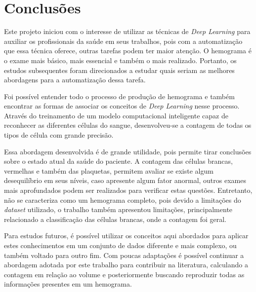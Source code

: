 \chapter{Conclusões}
\label{chap:conclusoes}

Este projeto iniciou com o interesse de utilizar as técnicas de \emph{Deep Learning} para auxiliar os profissionais da saúde em seus trabalhos, pois com a automatização que essa técnica oferece, outras tarefas podem ter maior atenção. O hemograma é o exame mais básico, mais essencial e também o mais realizado. Portanto, os estudos subsequentes foram direcionados a estudar quais seriam as melhores abordagens para a automatização dessa tarefa.

Foi possível entender todo o processo de produção de hemograma e também encontrar as formas de associar os conceitos de \emph{Deep Learning} nesse processo. Através do treinamento de um modelo computacional inteligente capaz de reconhecer as diferentes células do sangue, desenvolveu-se a contagem de todas os tipos de célula com grande precisão.

Essa abordagem desenvolvida é de grande utilidade, pois permite tirar conclusões sobre o estado atual da saúde do paciente. A contagem das células brancas, vermelhas e também das plaquetas, permitem avaliar se existe algum desequilíbrio em seus níveis, caso apresente algum fator anormal, outros exames mais aprofundados podem ser realizados para verificar estas questões. Entretanto, não se caracteriza como um hemograma completo, pois devido a limitações do \emph{dataset} utilizado, o trabalho também apresentou limitações, principalmente relacionado a classificação das células brancas, onde a contagem foi geral.

Para estudos futuros, é possível utilizar os conceitos aqui abordados para aplicar estes conhecimentos em um conjunto de dados diferente e mais complexo, ou também voltado para outro fim. Com poucas adaptações é possível continuar a abordagem adotada por este trabalho para contribuir na literatura, calculando a contagem em relação ao volume e posteriormente buscando reproduzir todas as informações presentes em um hemograma.
